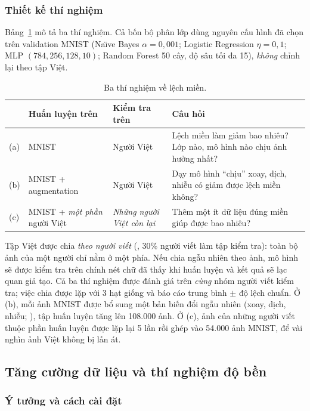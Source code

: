 \subsubsection{Thiết kế thí nghiệm}
Bảng~\ref{tab:vnexp} mô tả ba thí nghiệm. Cả bốn bộ phân lớp dùng nguyên cấu hình đã chọn trên validation MNIST (Na\"{\i}ve Bayes $\alpha=0{,}001$; Logistic Regression $\eta=0{,}1$; MLP $(784,256,128,10)$; Random Forest 50 cây, độ sâu tối đa 15), \emph{không} chỉnh lại theo tập Việt.

\begin{table}[H]
\centering
\caption{Ba thí nghiệm về lệch miền.}
\label{tab:vnexp}
\small
\begin{tabularx}{\linewidth}{@{}lp{3.6cm}p{3.1cm}X@{}}
\toprule
& Huấn luyện trên & Kiểm tra trên & Câu hỏi \\
\midrule
(a) & MNIST & Người Việt & Lệch miền làm giảm bao nhiêu? Lớp nào, mô hình nào chịu ảnh hưởng nhất? \\
(b) & MNIST + augmentation & Người Việt & Dạy mô hình ``chịu'' xoay, dịch, nhiễu có giảm được lệch miền không? \\
(c) & MNIST + \emph{một phần} người Việt & \emph{Những người Việt còn lại} & Thêm một ít dữ liệu đúng miền giúp được bao nhiêu? \\
\bottomrule
\end{tabularx}
\end{table}

Tập Việt được chia \emph{theo người viết} (, 30\% người viết làm tập kiểm tra): toàn bộ ảnh của một người chỉ nằm ở một phía. Nếu chia ngẫu nhiên theo ảnh, mô hình sẽ được kiểm tra trên chính nét chữ đã thấy khi huấn luyện và kết quả sẽ lạc quan giả tạo. Cả ba thí nghiệm được đánh giá trên \emph{cùng} nhóm người viết kiểm tra; việc chia được lặp với 3 hạt giống và báo cáo trung bình $\pm$ độ lệch chuẩn. Ở (b), mỗi ảnh MNIST được bổ sung một bản biến đổi ngẫu nhiên (xoay, dịch, nhiễu; ), tập huấn luyện tăng lên 108.000 ảnh. Ở (c), ảnh của những người viết thuộc phần huấn luyện được lặp lại 5 lần rồi ghép vào 54.000 ảnh MNIST, để vài nghìn ảnh Việt không bị lấn át.


\subsection{Tăng cường dữ liệu và thí nghiệm độ bền}

\subsubsection{Ý tưởng và cách cài đặt}

